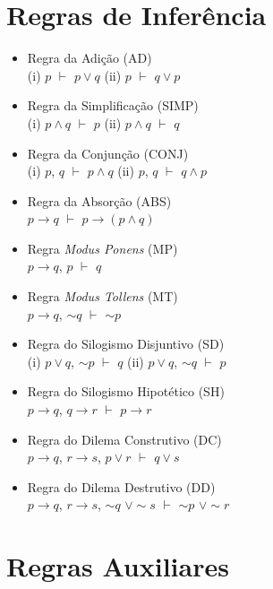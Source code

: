 \documentclass[12pt,a4paper,oneside]{article}
\begin{document}
\newpage

\section*{Regras de Inferência}

\begin{itemize}
	\item Regra da Adição (AD) \\
	(i) $p$ $\vdash$ $p\vee q$ \hspace*{0.5cm} (ii) $p$ $\vdash$ $q \vee p$
	\item Regra da Simplificação (SIMP) \\
	(i) $p \wedge q$ $\vdash$ $p$ \hspace*{0.5cm} (ii) $p \wedge q$ $\vdash$ $q$
	\item Regra da Conjunção (CONJ) \\
	(i) $p$, $q$ $\vdash$ $p \wedge q$ \hspace*{0.5cm} (ii) $p$, $q$ $\vdash$ $q \wedge p$
	\item Regra da Absorção (ABS) \\
	$p \rightarrow q$ $\vdash$ $p \rightarrow (p \wedge q)$
	\item Regra {\it Modus Ponens} (MP) \\
	$p \rightarrow q$, $p$ $\vdash$ $q$
	\item Regra {\it Modus Tollens} (MT) \\
	$p \rightarrow q$, $\sim q$ $\vdash$ $\sim p$
	\item Regra do Silogismo Disjuntivo (SD) \\
	(i) $p \vee q$, $\sim p$ $\vdash$ $q$ \hspace*{0.5cm} (ii) $p \vee q$, $\sim q$ $\vdash$ $p$
	\item Regra do Silogismo Hipotético (SH) \\
		$p \rightarrow q$, $q \rightarrow r$ $\vdash$ $p \rightarrow r$
	\item Regra do Dilema Construtivo (DC) \\
		$p \rightarrow q$, $r \rightarrow s$, $p \vee r$ $\vdash$ $q \vee s$
	\item Regra do Dilema Destrutivo (DD) \\
		$p \rightarrow q$, $r \rightarrow s$, $\sim q$ $\vee \sim s$ $\vdash$ $\sim p$ $\vee \sim r$
\end{itemize}

\section*{Regras Auxiliares}
\end{document}
